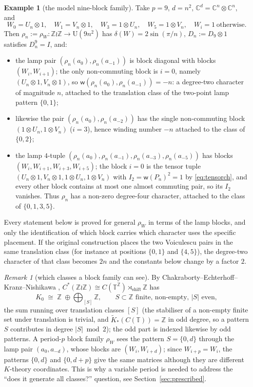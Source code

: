 \documentclass[11pt]{amsart}
\theoremstyle{definition}
\newtheorem{example}[theorem]{Example}
\theoremstyle{remark}
\newtheorem{remark}[theorem]{Remark}
\newcommand{\Z}{\mathbb Z}
\newcommand{\C}{\mathbb C}
\newcommand{\T}{\mathbb T}
\newcommand{\wind}{\mathsf w}
\newcommand{\U}{\mathrm U}
\newcommand{\lamp}{a}
\begin{document}
\begin{example}[the model nine-block family]\label{ex:model}
Take $p=9$, $d=n^2$, $\C^{d}=\C^n\otimes\C^n$, and
\[
W_0=U_n\otimes1,\quad W_1=V_n\otimes1,\quad W_3=1\otimes U_n,\quad W_5=1\otimes V_n,\quad W_i=1\ \text{otherwise}.
\]
Then $\rho_n:=\rho_W\colon\Z\wr\Z\to\U(9n^2)$ has $\delta(W)=2\sin(\pi/n)$, $D_n:=D_9\otimes 1$ satisfies $D_n^9=I$, and:
\begin{itemize}[leftmargin=2em]
\item the lamp pair $(\rho_n(\lamp_0),\rho_n(\lamp_{-1}))$ is block diagonal with blocks $(W_i,W_{i+1})$; the only non-commuting block is $i=0$, namely $(U_n\otimes1,V_n\otimes1)$, so $\wind(\rho_n(\lamp_0),\rho_n(\lamp_{-1}))=-n$: a degree-two character of magnitude $n$, attached to the translation class of the two-point lamp pattern $\{0,1\}$;
\item likewise the pair $(\rho_n(\lamp_0),\rho_n(\lamp_{-2}))$ has the single non-commuting block $(1\otimes U_n,1\otimes V_n)$ ($i=3$), hence winding number $-n$ attached to the class of $\{0,2\}$;
\item the lamp $4$-tuple $(\rho_n(\lamp_0),\rho_n(\lamp_{-1}),\rho_n(\lamp_{-3}),\rho_n(\lamp_{-5}))$ has blocks $(W_i,W_{i+1},W_{i+3},W_{i+5})$; the block $i=0$ is the tensor tuple $(U_n\otimes1,V_n\otimes1,1\otimes U_n,1\otimes V_n)$ with $I_2=\wind(P_n)^2=1$ by \eqref{eq:tensorch}, and every other block contains at most one almost commuting pair, so its $I_2$ vanishes. Thus $\rho_n$ has a non-zero degree-four character, attached to the class of $\{0,1,3,5\}$.
\end{itemize}
Every statement below is proved for general $\rho_W$ in terms of the lamp blocks, and only the identification of which block carries which character uses the specific placement. If the original construction places the two Voiculescu pairs in the same translation class (for instance at positions $\{0,1\}$ and $\{4,5\}$), the degree-two character of that class becomes $2n$ and the constants below change by a factor $2$.
\end{example}

\begin{remark}[which classes a block family can see]
By Chakraborty--Echterhoff--Kranz--Nishikawa \cite{CEKN22}, $C^*(\Z\wr\Z)\cong C(\T^{\Z})\rtimes_{\mathrm{shift}}\Z$ has
\[
K_0\;\cong\;\Z\;\oplus\bigoplus_{[S]}\Z ,\qquad S\subset\Z\text{ finite, non-empty, }|S|\text{ even},
\]
the sum running over translation classes $[S]$ (the stabiliser of a non-empty finite set under translation is trivial, and $\widetilde K_*(C(\T))=\Z$ in odd degree, so a pattern $S$ contributes in degree $|S|\bmod2$); the odd part is indexed likewise by odd patterns. A period-$p$ block family $\rho_W$ sees the pattern $S=\{0,d\}$ through the lamp pair $(\lamp_0,\lamp_{-d})$, whose blocks are $(W_i,W_{i+d})$; since $W_{i+p}=W_i$, the patterns $\{0,d\}$ and $\{0,d+p\}$ give the same matrices although they are different $K$-theory coordinates. This is why a variable period is needed to address the ``does it generate all classes?'' question, see Section~\ref{sec:prescribed}.
\end{remark}
\end{document}

